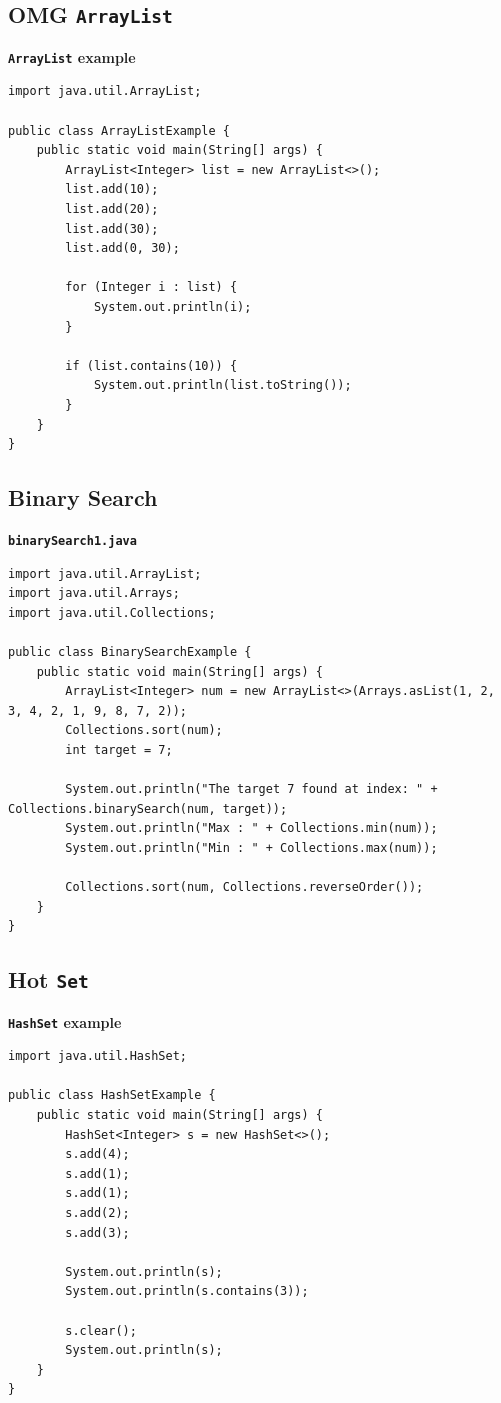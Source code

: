 \documentclass{book}
\begin{document}
\subsection{OMG \texttt{ArrayList}}

\textbf{\texttt{ArrayList} example}

\begin{verbatim}
import java.util.ArrayList;

public class ArrayListExample {
    public static void main(String[] args) {
        ArrayList<Integer> list = new ArrayList<>();
        list.add(10);
        list.add(20);
        list.add(30);
        list.add(0, 30);

        for (Integer i : list) {
            System.out.println(i);
        }

        if (list.contains(10)) {
            System.out.println(list.toString());
        }
    }
}
\end{verbatim}

\subsection{Binary Search}

\textbf{\texttt{binarySearch1.java}}

\begin{verbatim}
import java.util.ArrayList;
import java.util.Arrays;
import java.util.Collections;

public class BinarySearchExample {
    public static void main(String[] args) {
        ArrayList<Integer> num = new ArrayList<>(Arrays.asList(1, 2, 3, 4, 2, 1, 9, 8, 7, 2));
        Collections.sort(num);
        int target = 7;

        System.out.println("The target 7 found at index: " + Collections.binarySearch(num, target));
        System.out.println("Max : " + Collections.min(num));
        System.out.println("Min : " + Collections.max(num));

        Collections.sort(num, Collections.reverseOrder());
    }
}
\end{verbatim}

\subsection{Hot \texttt{Set}}

\textbf{\texttt{HashSet} example}

\begin{verbatim}
import java.util.HashSet;

public class HashSetExample {
    public static void main(String[] args) {
        HashSet<Integer> s = new HashSet<>();
        s.add(4);
        s.add(1);
        s.add(1);
        s.add(2);
        s.add(3);

        System.out.println(s);
        System.out.println(s.contains(3));

        s.clear();
        System.out.println(s);
    }
}
\end{verbatim}
\end{document}

